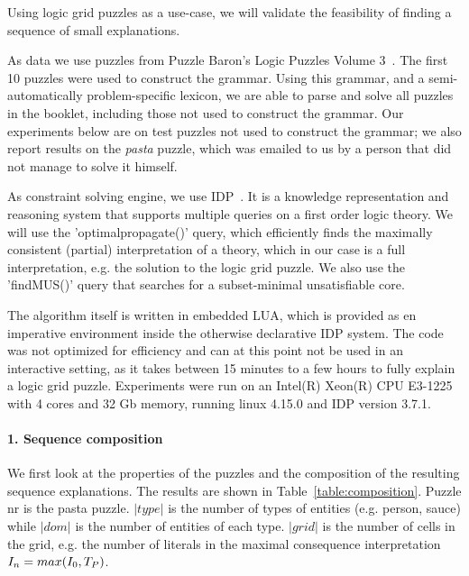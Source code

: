 Using logic grid puzzles as a use-case, we will validate the feasibility of finding a sequence of small explanations.

As data we use puzzles from Puzzle Baron’s Logic Puzzles Volume 3~\cite{logigrammen}. The first 10 puzzles were used to construct the grammar. Using this grammar, and a semi-automatically problem-specific lexicon, we are able to parse and solve all puzzles in the booklet, including those not used to construct the grammar. Our experiments below are on test puzzles not used to construct the grammar; we also report results on the \textit{pasta} puzzle, which was emailed to us by a person that did not manage to solve it himself.

As constraint solving engine, we use IDP~\cite{idp}. It is a knowledge representation and reasoning system that supports multiple queries on a first order logic theory. We will use the 'optimalpropagate()' query, which efficiently finds the maximally consistent (partial) interpretation of a theory, which in our case is a full interpretation, e.g. the solution to the logic grid puzzle. We also use the 'findMUS()' query that searches for a subset-minimal unsatisfiable core.

The algorithm itself is written in embedded LUA, which is provided as en imperative environment inside the otherwise declarative IDP system. The code was not optimized for efficiency and can at this point not be used in an interactive setting, as it takes between 15 minutes to a few hours to fully explain a logic grid puzzle. Experiments were run on an Intel(R) Xeon(R) CPU E3-1225 with 4 cores and 32 Gb memory, running linux 4.15.0 and IDP version 3.7.1.

\paragraph{1. Sequence composition}
We first look at the properties of the puzzles and the composition of the resulting sequence explanations. The results are shown in Table~\ref{table:composition}. Puzzle nr  is the pasta puzzle. $|type|$ is the number of types of entities (e.g. person, sauce) while $|dom|$ is the number of entities of each type. $|grid|$ is the number of cells in the grid, e.g. the number of literals in the maximal consequence interpretation $I_n=max(I_0,T_P)$.

